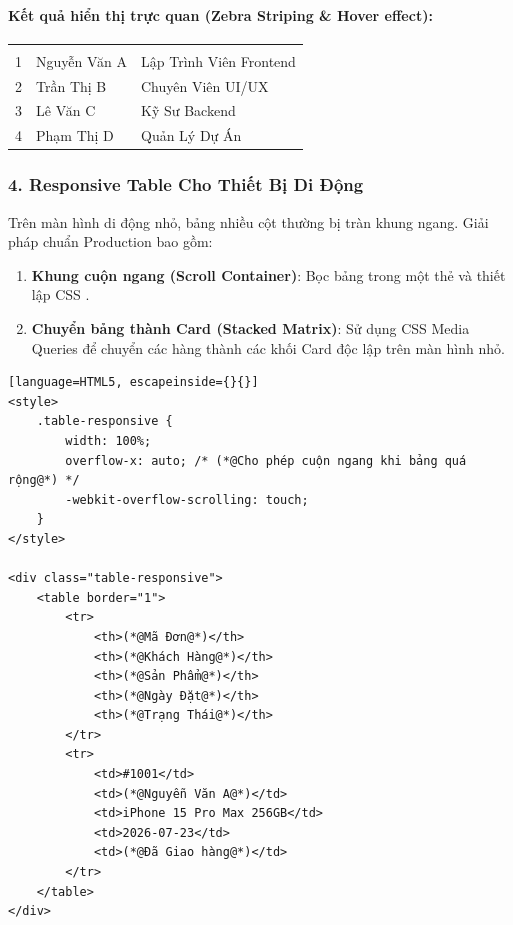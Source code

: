 \paragraph{\textbf{Kết quả hiển thị trực quan (Zebra Striping \& Hover effect):}}
\begin{prettyTableBox}
\begin{tabularx}{\linewidth}{C{1.5cm} Z Z}
 &  &  \\
1 & Nguyễn Văn A & Lập Trình Viên Frontend \\
2 & Trần Thị B & Chuyên Viên UI/UX \\
3 & Lê Văn C & Kỹ Sư Backend \\
4 & Phạm Thị D & Quản Lý Dự Án \\
\end{tabularx}
\end{prettyTableBox}

\subsubsection{4. Responsive Table Cho Thiết Bị Di Động}

Trên màn hình di động nhỏ, bảng nhiều cột thường bị tràn khung ngang. Giải pháp chuẩn Production bao gồm:

\begin{enumerate}[leftmargin=1.5em, itemsep=3pt, parsep=0pt]
    \item \textbf{Khung cuộn ngang (Scroll Container)}: Bọc bảng trong một thẻ  và thiết lập CSS .
    \item \textbf{Chuyển bảng thành Card (Stacked Matrix)}: Sử dụng CSS Media Queries để chuyển các hàng  thành các khối Card độc lập trên màn hình nhỏ.
\end{enumerate}

\begin{codeWindow}
\begin{lstlisting}[language=HTML5, escapeinside={}{}]
<style>
    .table-responsive {
        width: 100%;
        overflow-x: auto; /* (*@Cho phép cuộn ngang khi bảng quá rộng@*) */
        -webkit-overflow-scrolling: touch;
    }
</style>

<div class="table-responsive">
    <table border="1">
        <tr>
            <th>(*@Mã Đơn@*)</th>
            <th>(*@Khách Hàng@*)</th>
            <th>(*@Sản Phẩm@*)</th>
            <th>(*@Ngày Đặt@*)</th>
            <th>(*@Trạng Thái@*)</th>
        </tr>
        <tr>
            <td>#1001</td>
            <td>(*@Nguyễn Văn A@*)</td>
            <td>iPhone 15 Pro Max 256GB</td>
            <td>2026-07-23</td>
            <td>(*@Đã Giao hàng@*)</td>
        </tr>
    </table>
</div>
\end{lstlisting}
\end{codeWindow}

